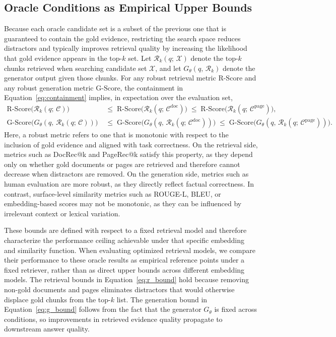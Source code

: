 \documentclass[12pt,twoside,maitrise]{dms}
\theoremstyle{definition}
\numberwithin{equation}{section}
\numberwithin{table}{chapter}
\numberwithin{figure}{chapter}
\begin{document}
\subsection{Oracle Conditions as Empirical Upper Bounds}
\label{sec:oracle_bounds}

Because each oracle candidate set is a subset of the previous one that is guaranteed
to contain the gold evidence, restricting the search space reduces distractors and typically improves retrieval quality by increasing the likelihood that gold evidence appears in the top-$k$ set.  Let $\mathcal{R}_k(q;\,\mathcal{X})$
denote the top-$k$ chunks retrieved when searching candidate set $\mathcal{X}$, and
let $G_\theta(q,\,\mathcal{R}_k)$ denote the generator output given those chunks.  For
any robust retrieval metric $\mathrm{R\text{-}Score}$ and any robust generation metric
$\mathrm{G\text{-}Score}$, the containment in Equation~\eqref{eq:containment} implies,
in expectation over the evaluation set,
\begin{align}
  \mathrm{R\text{-}Score}\!\bigl(\mathcal{R}_k(q;\,\mathcal{C})\bigr)
    &\;\leq\;
  \mathrm{R\text{-}Score}\!\bigl(\mathcal{R}_k(q;\,\mathcal{C}^{\mathrm{doc}})\bigr)
    \;\leq\;
  \mathrm{R\text{-}Score}\!\bigl(\mathcal{R}_k(q;\,\mathcal{C}^{\mathrm{page}})\bigr),
  \label{eq:r_bound}\\[4pt]
  \mathrm{G\text{-}Score}\!\bigl(G_\theta(q,\,\mathcal{R}_k(q;\,\mathcal{C}))\bigr)
    &\;\leq\;
  \mathrm{G\text{-}Score}\!\bigl(G_\theta(q,\,\mathcal{R}_k(q;\,\mathcal{C}^{\mathrm{doc}}))\bigr)
    \;\leq\;
  \mathrm{G\text{-}Score}\!\bigl(G_\theta(q,\,\mathcal{R}_k(q;\,\mathcal{C}^{\mathrm{page}}))\bigr).
  \label{eq:g_bound}
\end{align}
Here, a robust metric refers to one that is monotonic with respect to the inclusion of gold evidence and aligned with task correctness. On the retrieval side, metrics such as DocRec@k and PageRec@k satisfy this property, as they depend only on whether gold documents or pages are retrieved and therefore cannot decrease when distractors are removed. On the generation side, metrics such as human evaluation are more robust, as they directly reflect factual correctness. In contrast, surface-level similarity metrics such as ROUGE-L, BLEU, or embedding-based scores may not be monotonic, as they can be influenced by irrelevant context or lexical variation.

These bounds are defined with respect to a fixed retrieval model and therefore characterize the performance ceiling achievable under that specific embedding and similarity function. When evaluating optimized retrieval models, we compare their performance to these oracle results as empirical reference points under a fixed retriever, rather than as direct upper bounds across different embedding models. The retrieval bounds in Equation~\eqref{eq:r_bound} hold because removing non-gold
documents and pages eliminates distractors that would otherwise displace gold chunks
from the top-$k$ list. The generation bound in Equation~\eqref{eq:g_bound} follows from the fact that the generator $G_\theta$ is fixed across conditions, so improvements in retrieved evidence quality propagate to downstream answer quality.
\end{document}
